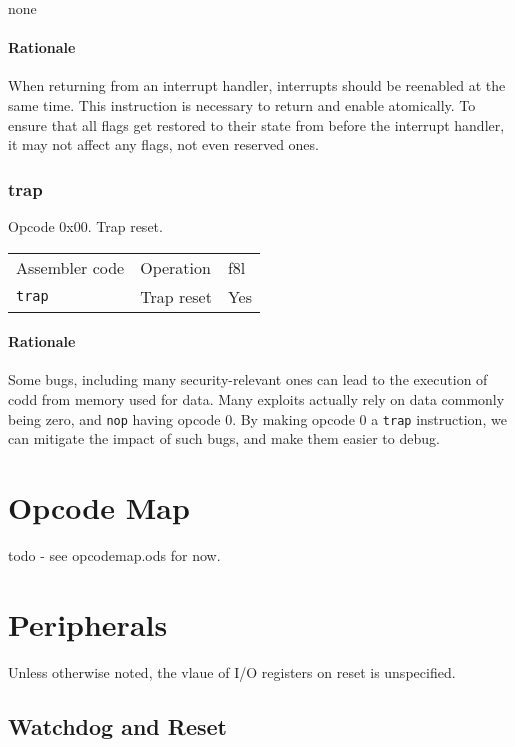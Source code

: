 \documentclass{book}
\begin{document}
none

\subsubsection*{Rationale}

When returning from an interrupt handler, interrupts should be reenabled at the same time. This instruction is necessary to return and enable atomically. To ensure that all flags get restored to their state from before the interrupt handler, it may not affect any flags, not even reserved ones.


\subsection{trap}

Opcode 0x00. Trap reset.

\begin{tabular}{l l l}
Assembler code  & Operation  & f8l \\
\texttt{trap}   & Trap reset & Yes \\
\end{tabular}

\subsubsection*{Rationale}

Some bugs, including many security-relevant ones can lead to the execution of codd from memory used for data. Many exploits actually rely on data commonly being zero, and \texttt{nop} having opcode 0. By making opcode 0 a \texttt{trap} instruction, we can mitigate the impact of such bugs, and make them easier to debug.


\chapter{Opcode Map}

todo - see opcodemap.ods for now.

\chapter{Peripherals}

Unless otherwise noted, the vlaue of I/O registers on reset is unspecified.

\section{Watchdog and Reset}
\end{document}
